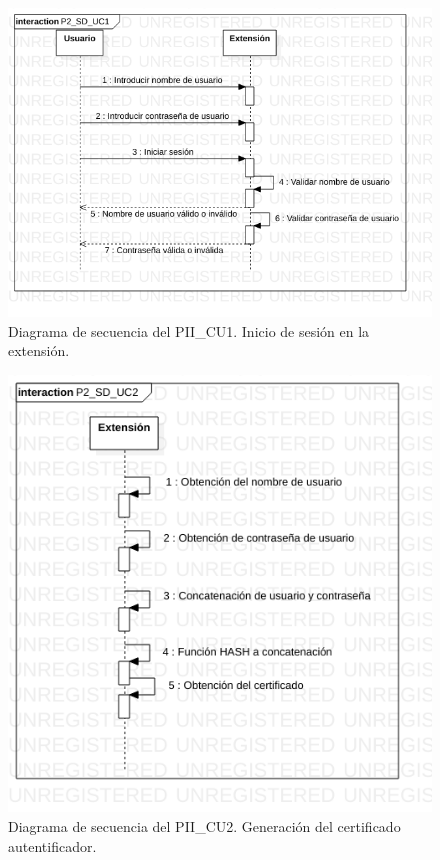 \documentclass[12pt, a4paper, titlepage]{report}
\begin{document}
    		    \begin{figure}[H]
    				\begin{center}    		    	\includegraphics[width=15cm]{./imagenes/Desarrollo/Prototipo_2/P2_SD_UC1.png}
    				\caption[Diagrama de secuencia 1 del Prototipo II]{Diagrama de secuencia del PII\_CU1. Inicio de sesión en la extensión.}
    				\end{center}
    			\end{figure}
    			
    			\begin{figure}[H]
    				\begin{center}    		    	\includegraphics[width=15cm]{./imagenes/Desarrollo/Prototipo_2/P2_SD_UC2.png}
    				\caption[Diagrama de secuencia 2 del Prototipo II]{Diagrama de secuencia del PII\_CU2. Generación del certificado autentificador.}
    				\end{center}
    			\end{figure}
    			
\end{document}
